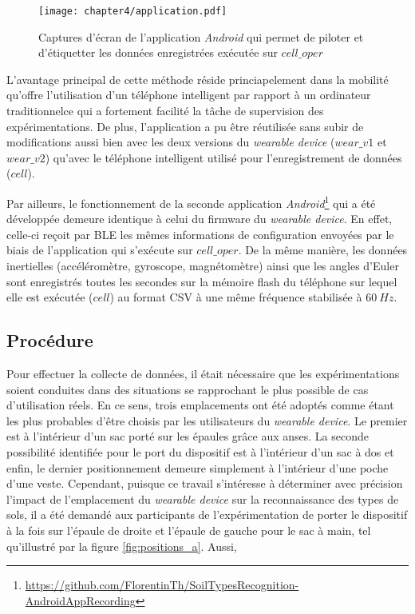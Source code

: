 \begin{figure}[H]
	\centering
	\texttt{[image: chapter4/application.pdf]}
        \caption{Captures d'écran de l'application \textit{Android} qui permet de piloter et d'étiquetter les données enregistrées exécutée sur $cell\_oper$}
	\label{fig:application}
\end{figure}

\noindent L'avantage principal de cette méthode réside princiapelement dans la mobilité qu'offre l'utilisation d'un téléphone intelligent par rapport à un ordinateur traditionnel\textemdash ce qui a fortement facilité la tâche de supervision des expérimentations. De plus, l'application a pu être réutilisée sans subir de modifications aussi bien avec les deux versions du \textit{wearable device} ($wear\_v1$ et $wear\_v2$) qu'avec le téléphone intelligent utilisé pour l'enregistrement de données ($cell$).

Par ailleurs, le fonctionnement de la seconde application \textit{Android}\footnote{\url{https://github.com/FlorentinTh/SoilTypesRecognition-AndroidAppRecording}} qui a été développée demeure identique à celui du firmware du \textit{wearable device}. En effet, celle-ci reçoit par \acs{BLE} les mêmes informations de configuration envoyées par le biais de l'application qui s'exécute sur $cell\_oper$. De la même manière, les données inertielles (accéléromètre, gyroscope, magnétomètre) ainsi que les angles d'Euler sont enregistrés toutes les secondes sur la mémoire flash du téléphone sur lequel elle est exécutée ($cell$) au format \acs{CSV} à une même fréquence stabilisée à $60\: Hz$.

\subsection{Procédure}

Pour effectuer la collecte de données, il était nécessaire que les expérimentations soient conduites dans des situations se rapprochant le plus possible de cas d'utilisation réels. En ce sens, trois emplacements ont été adoptés comme étant les plus probables d'être choisis par les utilisateurs du \textit{wearable device}. Le premier est à l'intérieur d'un sac porté sur les épaules grâce aux anses. La seconde possibilité identifiée pour le port du dispositif est à l'intérieur d'un sac à dos et enfin, le dernier positionnement demeure simplement à l'intérieur d'une poche d'une veste. Cependant, puisque ce travail s'intéresse à déterminer avec précision l'impact de l'emplacement du \textit{wearable device} sur la reconnaissance des types de sols, il a été demandé aux participants de l'expérimentation de porter le dispositif à la fois sur l'épaule de droite et l'épaule de gauche pour le sac à main, tel qu'illustré par la figure \ref{fig:positions_a}. Aussi, 



